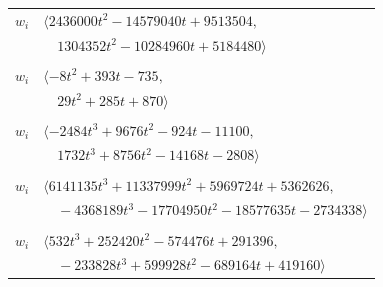 \documentclass[11pt]{article}
\begin{document}
\begin{longtable}{@{}ll@{}}
$w_i$ & $\langle 2436000t^{2}-14579040t+9513504,$\\
 & $\quad 1304352t^{2}-10284960t+5184480\rangle$\\
\addlinespace[2pt]
\multicolumn{2}{@{}p{0.97\textwidth}@{}}{$i=20$, $D_i=1$, $\rho_{ij}$: $3{:}1, \allowbreak 6{:}2, \allowbreak 10{:}2, \allowbreak 22{:}1, \allowbreak 30{:}1, \allowbreak 32{:}2, \allowbreak 34{:}2, \allowbreak 43{:}2, \allowbreak 60{:}1, \allowbreak 62{:}1$}\\
$w_i$ & $\langle -8t^{2}+393t-735,$\\
 & $\quad 29t^{2}+285t+870\rangle$\\
\addlinespace[2pt]
\multicolumn{2}{@{}p{0.97\textwidth}@{}}{$i=21$, $D_i=1$, $\rho_{ij}$: $8{:}1, \allowbreak 9{:}1, \allowbreak 13{:}2, \allowbreak 17{:}2, \allowbreak 18{:}2, \allowbreak 25{:}2, \allowbreak 34{:}2, \allowbreak 36{:}2, \allowbreak 37{:}1, \allowbreak 43{:}2, \allowbreak 44{:}1, \allowbreak 53{:}2, \allowbreak 60{:}2, \allowbreak 63{:}1$}\\
$w_i$ & $\langle -2484t^{3}+9676t^{2}-924t-11100,$\\
 & $\quad 1732t^{3}+8756t^{2}-14168t-2808\rangle$\\
\addlinespace[2pt]
\multicolumn{2}{@{}p{0.97\textwidth}@{}}{$i=22$, $D_i=1$, $\rho_{ij}$: $3{:}2, \allowbreak 4{:}2, \allowbreak 15{:}2, \allowbreak 16{:}1, \allowbreak 20{:}2, \allowbreak 27{:}2, \allowbreak 31{:}1, \allowbreak 32{:}2, \allowbreak 34{:}1, \allowbreak 40{:}1, \allowbreak 51{:}1, \allowbreak 55{:}2, \allowbreak 57{:}1, \allowbreak 60{:}1, \allowbreak 61{:}1, \allowbreak 62{:}2, \allowbreak 64{:}1$}\\
$w_i$ & $\langle 6141135t^{3}+11337999t^{2}+5969724t+5362626,$\\
 & $\quad -4368189t^{3}-17704950t^{2}-18577635t-2734338\rangle$\\
\addlinespace[2pt]
\multicolumn{2}{@{}p{0.97\textwidth}@{}}{$i=23$, $D_i=1$, $\rho_{ij}$: $1{:}1, \allowbreak 2{:}1, \allowbreak 5{:}2, \allowbreak 13{:}1, \allowbreak 17{:}1, \allowbreak 18{:}1, \allowbreak 19{:}2, \allowbreak 25{:}1, \allowbreak 35{:}1, \allowbreak 37{:}1, \allowbreak 40{:}2, \allowbreak 46{:}1, \allowbreak 49{:}2, \allowbreak 51{:}2, \allowbreak 52{:}2, \allowbreak 56{:}2, \allowbreak 59{:}2, \allowbreak 60{:}2, \allowbreak 61{:}1, \allowbreak 63{:}2$}\\
$w_i$ & $\langle 532t^{3}+252420t^{2}-574476t+291396,$\\
 & $\quad -233828t^{3}+599928t^{2}-689164t+419160\rangle$\\

\end{longtable}
\end{document}
